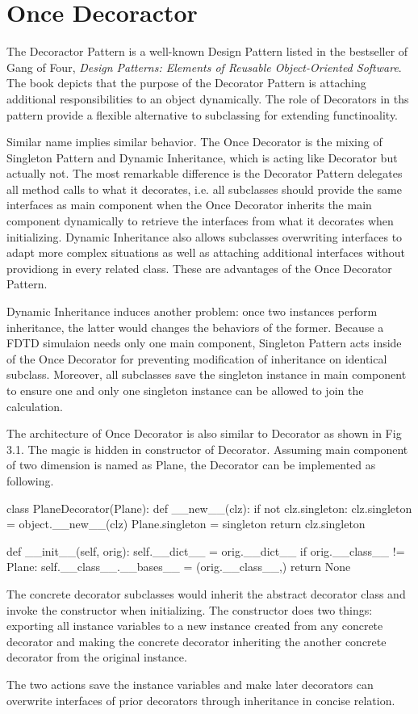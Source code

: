\section{Once Decoractor}
The Decoractor Pattern is a well-known Design Pattern listed in the bestseller of Gang of Four, \textit{Design Patterns:
  Elements of Reusable Object-Oriented Software}. The book depicts that the purpose of the Decorator Pattern is
attaching additional responsibilities to an object dynamically. The role of Decorators in ths pattern provide a flexible
alternative to subclassing for extending functinoality.

Similar name implies similar behavior. The Once Decorator is the mixing of Singleton Pattern and Dynamic Inheritance,
which is acting like Decorator but actually not. The most remarkable difference is the Decorator Pattern delegates all
method calls to what it decorates, i.e. all subclasses should provide the same interfaces as main component when the
Once Decorator inherits the main component dynamically to retrieve the interfaces from what it decorates when
initializing. Dynamic Inheritance also allows subclasses overwriting interfaces to adapt more complex situations as well
as attaching additional interfaces without providiong in every related class. These are advantages of the Once Decorator
Pattern.

Dynamic Inheritance induces another problem: once two instances perform inheritance, the latter would changes the
behaviors of the former. Because a FDTD simulaion needs only one main component, Singleton Pattern acts inside of the
Once Decorator for preventing modification of inheritance on identical subclass. Moreover, all subclasses save the
singleton instance in main component to ensure one and only one singleton instance can be allowed to join the
calculation.

The architecture of Once Decorator is also similar to Decorator as shown in Fig 3.1. The magic is hidden in constructor
of Decorator. Assuming main component of two dimension is named as Plane, the Decorator can be implemented as following.
\begin{code}
  class PlaneDecorator(Plane):
    def __new__(clz):
        if not clz.singleton:
            clz.singleton = object.__new__(clz)
            Plane.singleton = singleton
        return clz.singleton

    def __init__(self, orig):
        self.__dict__ = orig.__dict__
        if orig.__class__ != Plane:
            self.__class__.__bases__ = (orig.__class__,)
        return None
\end{code}
The concrete decorator subclasses would inherit the abstract decorator class and invoke the constructor when
initializing. The constructor does two things: exporting all instance variables to a new instance created from any
concrete decorator and making the concrete decorator inheriting the another concrete decorator from the original
instance.

The two actions save the instance variables and make later decorators can overwrite interfaces of prior decorators
through inheritance in concise relation.
